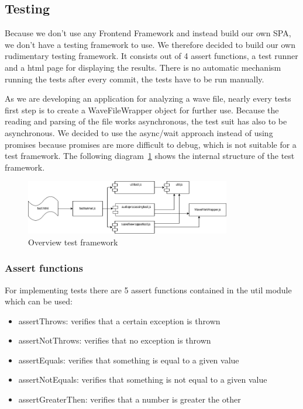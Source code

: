 \subsection{Testing}\label{subsec:testing}
Because we don't use any Frontend Framework and instead build our own SPA, we don't have a testing framework to use.
We therefore decided to build our own rudimentary testing framework.
It consists out of 4 assert functions, a test runner and a html page for displaying the results.
There is no automatic mechanism running the tests after every commit, the tests have to be run manually.

As we are developing an application for analyzing a wave file, nearly every tests first step is to create a WaveFileWrapper object for further use.
Because the reading and parsing of the file works asynchronous, the test suit has also to be asynchronous.
We decided to use the async/wait approach instead of using promises because promises are more difficult to debug, which is not suitable for a test framework.
The following diagram~\ref{fig:overview-test-framework} shows the internal structure of the test framework.

\begin{figure}[H]
    \centering
    \includegraphics[width=0.8\textwidth]{../assets/overview_test_framework.png}
    \caption{Overview test framework}\label{fig:overview-test-framework}
\end{figure}

\subsubsection{Assert functions}
For implementing tests there are 5 assert functions contained in the util module which can be used:

\begin{itemize}
    \item assertThrows: verifies that a certain exception is thrown
    \item assertNotThrows: verifies that no exception is thrown
    \item assertEquals: verifies that something is equal to a given value
    \item assertNotEquals: verifies that something is not equal to a given value
    \item assertGreaterThen: verifies that a number is greater the other
\end{itemize}

